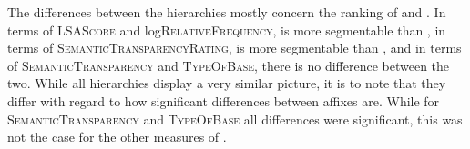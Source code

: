 \begin{table}
	\caption{Segmentability hierarchies for each decomposability measure}
	\label{tbl:summary comparison of affix}
	
	
\end{table}



The differences  between the hierarchies mostly concern the ranking of  and . In terms of \textsc{LSAScore} and log\textsc{RelativeFrequency},  is more segmentable than , in terms of \textsc{SemanticTransparencyRating},  is more segmentable than , and in terms of \textsc{SemanticTransparency} and \textsc{TypeOfBase}, there is no difference between the two. 
While all hierarchies display a very similar picture, it is to note that they differ with regard to how significant differences between affixes are. While for \textsc{SemanticTransparency} and \textsc{TypeOfBase} all differences were significant, this was not the case for the other measures of . 


